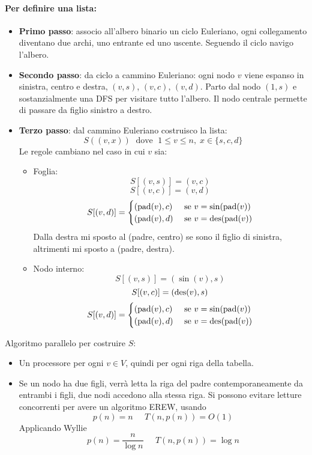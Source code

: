 \paragraph{Per definire una lista: }
\begin{itemize}
	\item \textbf{Primo passo}: associo all'albero binario un ciclo Euleriano, ogni collegamento diventano due archi, uno entrante ed uno uscente. Seguendo il ciclo navigo l'albero.\\
	
	\item \textbf{Secondo passo}: da ciclo a cammino Euleriano: ogni nodo $v$ viene espanso in sinistra, centro e destra, $(v,s)$, $(v,c)$, $(v,d)$. Parto dal nodo $(1,s)$ e sostanzialmente una DFS per visitare tutto l'albero. Il nodo centrale permette di passare da figlio sinistro a destro.\\
	
	\newpage
	
	\item \textbf{Terzo passo}: dal cammino Euleriano costruisco la lista: 
	$$ S ((v, x)) \; \text{ dove } \; 1 \leq v \leq n, \; x \in \{s,c,d\}$$
	Le regole cambiano nel caso in cui $v$ sia:
	\begin{itemize}
		\item Foglia:
		$$ S [(v, s)] = (v,c) $$
		$$ S [(v, c)] = (v,d) $$
		$$ S [(v, d)] = \begin{cases} 
			(\operatorname{pad}(v), c) & \text{ se } v = \sin (\operatorname{pad}(v)) \\
			(\operatorname{pad}(v), d) & \text{ se } v = \operatorname{des} (\operatorname{pad} (v))
			\end {cases}$$
			Dalla destra mi sposto al (padre, centro) se sono il figlio di sinistra, altrimenti mi sposto a (padre, destra).
			
			\item Nodo interno:
			$$ S [(v, s)] = (\sin(v),s) $$
			$$ S [(v, c)] = (\operatorname{des}(v),s) $$
			$$ S [(v, d)] = 
			\begin{cases} 
				(\operatorname{pad}(v), c) & \text{ se } v = \sin (\operatorname{pad}(v)) \\
				(\operatorname{pad}(v), d) & \text{ se } v = \operatorname{des} (\operatorname{pad} (v))
			\end{cases}
			$$
		\end{itemize}
	\end{itemize}
	
	Algoritmo parallelo per costruire $S$:
	\begin{itemize}
		\item Un processore per ogni $v \in V$, quindi per ogni riga della tabella.\\
		
		\item Se un nodo ha due figli, verrà letta la riga del padre contemporaneamente da entrambi i figli, due nodi accedono alla stessa riga. Si possono evitare letture concorrenti per avere un algoritmo EREW, usando 
		$$ p(n) = n \;\;\;\;\; T(n, p(n)) = O(1) $$
		Applicando Wyllie
		$$ p(n) = \frac{n}{\log n} \;\;\;\;\; T(n, p(n)) = \log n $$
	\end{itemize}
	
